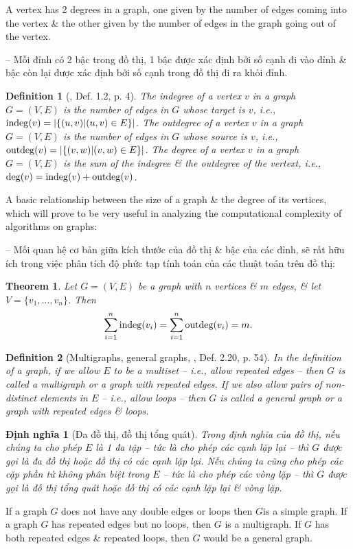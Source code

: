 \documentclass[oneside]{book}
\newtheorem{definition}{Definition}
\newtheorem{dinhnghia}{Định nghĩa}
\newtheorem{theorem}{Theorem}
\begin{document}
A vertex has 2 degrees in a graph, one given by the number of edges coming into the vertex \& the other given by the number of edges in the graph going out of the vertex.

-- Mỗi đỉnh có 2 bậc trong đồ thị, 1 bậc được xác định bởi số cạnh đi vào đỉnh \& bậc còn lại được xác định bởi số cạnh trong đồ thị đi ra khỏi đỉnh.

\begin{definition}[\cite{Valiente2021}, Def. 1.2, p. 4]
	The {\rm indegree} of a vertex $v$ in a graph $G = (V,E)$ is the number of edges in $G$ whose target is $v$, i.e., ${\rm indeg}(v) = |\{(u,v)|(u,v)\in E\}|$. The {\rm outdegree} of a vertex $v$ in a graph $G = (V,E)$ is the number of edges in $G$ whose source is $v$, i.e., ${\rm outdeg}(v) = |\{(v,w)|(v,w)\in E\}|$. The {\rm degree} of a vertex $v$ in a graph $G = (V,E)$ is the sum of the indegree \& the outdegree of the vertext, i.e., ${\rm deg}(v) = {\rm indeg}(v) + {\rm outdeg}(v)$.
\end{definition}
A basic relationship between the size of a graph \& the degree of its vertices, which will prove to be very useful in analyzing the computational complexity of algorithms on graphs:

-- Mối quan hệ cơ bản giữa kích thước của đồ thị \& bậc của các đỉnh, sẽ rất hữu ích trong việc phân tích độ phức tạp tính toán của các thuật toán trên đồ thị:

\begin{theorem}
	Let $G = (V,E)$ be a graph with $n$ vertices \& $m$ edges, \& let $V = \{v_1,\ldots,v_n\}$. Then
	\begin{equation*}
		\sum_{i=1}^n {\rm indeg}(v_i) = \sum_{i=1}^n {\rm outdeg}(v_i) = m.
	\end{equation*}
\end{theorem}

\begin{definition}[Multigraphs, general graphs, \cite{Shahriari2022}, Def. 2.20, p. 54]
	In the definition of a graph, if we allow $E$ to be a multiset -- i.e., allow {\rm repeated edges} -- then $G$ is called a {\rm multigraph} or a {\rm graph with repeated edges}. If we also allow pairs of non-distinct elements in $E$ -- i.e., allow {\rm loops} -- then $G$ is called a {\rm general graph} or a {\rm graph with repeated edges \& loops}.
\end{definition}

\begin{dinhnghia}[Đa đồ thị, đồ thị tổng quát]
	Trong định nghĩa của đồ thị, nếu chúng ta cho phép $E$ là 1 đa tập -- tức là cho phép {\rm các cạnh lặp lại} -- thì $G$ được gọi là {\rm đa đồ thị} hoặc {\rm đồ thị có các cạnh lặp lại}. Nếu chúng ta cũng cho phép các cặp phần tử không phân biệt trong $E$ -- tức là cho phép {\rm các vòng lặp} -- thì $G$ được gọi là {\rm đồ thị tổng quát} hoặc {\rm đồ thị có các cạnh lặp lại \& vòng lặp}.
\end{dinhnghia}
If a graph $G$ does not have any double edges or loops then $G$is a simple graph. If a graph $G$ has repeated edges but no loops, then $G$ is a multigraph. If $G$ has both repeated edges \& repeated loops, then $G$ would be a general graph.
\end{document}
